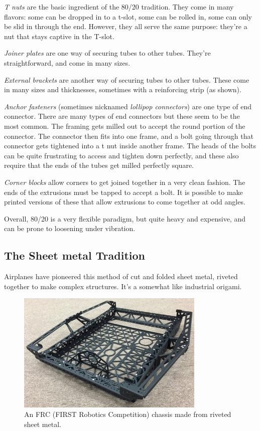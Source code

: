 \documentclass[10pt,letterpaper]{book}
\begin{document}
	\begin{asparaenum}[a)]
		\item \textit{T nuts} are the basic ingredient of the 80/20 tradition. They come in many flavors: some can be dropped in to a t-slot, some can be rolled in, some can only be slid in through the end. However, they all serve the same purpose: they're a nut that stays captive in the T-slot.
		\item \textit{Joiner plates} are one way of securing tubes to other tubes. They're straightforward, and come in many sizes.
		\item \textit{External brackets} are another way of securing tubes to other tubes. These come in many sizes and thicknesses, sometimes with a reinforcing strip (as shown).
		\item \textit{Anchor fasteners} (sometimes nicknamed \textit{lollipop connectors}) are one type of end connector. There are many types of end connectors but these seem to be the most common. The framing gets milled out to accept the round portion of the connector. The connector then fits into one frame, and a bolt going through that connector gets tightened into a t nut inside another frame. The heads of the bolts can be quite frustrating to access and tighten down perfectly, and these also require that the ends of the tubes get milled perfectly square.
		\item \textit{Corner blocks} allow corners to get joined together in a very clean fashion. The ends of the extrusions must be tapped to accept a bolt. It is possible to make printed versions of these that allow extrusions to come together at odd angles.
	\end{asparaenum}
	
	Overall, 80/20 is a very flexible paradigm, but quite heavy and expensive, and can be prone to loosening under vibration.
	
	\subsection{The Sheet metal Tradition}
	Airplanes have pioneered this method of cut and folded sheet metal, riveted together to make complex structures. It's a somewhat like industrial origami.
	
	\begin{figure}[H]
		\includegraphics[width=0.8\textwidth]{imgs/tradition_sheetmetal_148.png}
		\caption{An FRC (FIRST Robotics Competition) chassis made from riveted sheet metal.}
	\end{figure}
	
\end{document}
